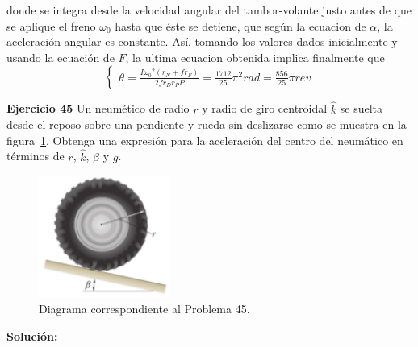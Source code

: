 \documentclass[a4paper,11pt]{scrartcl}
\begin{document}
\begin{center}
\hfill \break
donde se integra desde la velocidad angular del tambor-volante justo antes de que se aplique el freno $\omega_0$ hasta que éste se detiene, que según la ecuacion de $\alpha$, la aceleración angular es constante. Así, tomando los valores dados inicialmente y usando la ecuación de $F$, la ultima ecuacion obtenida implica finalmente que\\
\hfill \break
\begin{equation*}
  \left\lbrace
  \begin{array}{l}
  \theta = \frac{I {\omega_0}^2 (r_N + f r_F)}{2 f r_D r_P P} = \frac{1712}{25} {\pi}^2 rad = \frac{856}{25} \pi rev
  \end{array}
  \right.
\end{equation*}
\end{center}

\newpage

\textbf{Ejercicio 45} Un neumético de radio $r$ y radio de giro centroidal $\hat{k}$ se suelta desde el reposo sobre una pendiente y rueda sin deslizarse como se muestra en la  figura~\ref{fig:45_1}. Obtenga una expresión para la aceleración del centro del neumático en términos de $r$, $\hat{k}$, $\beta$ y $g$.\\

\begin{figure}[H]
  \centering
  \includegraphics[height=4cm]{45_1}
  \caption{Diagrama correspondiente al Problema 45.}
  \label{fig:45_1}
\end{figure}

\textbf{Solución:}
\end{document}
